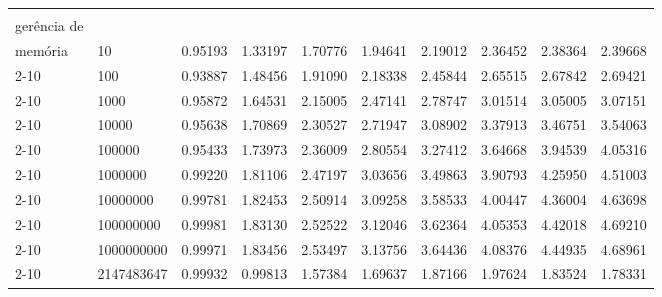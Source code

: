 \begin{flushleft}
{\begin{tabular}{|p{1.5cm}|p{1.2cm}|p{1.3cm}|p{1.3cm}|p{1.3cm}|p{1.3cm}|p{1.3cm}|p{1.3cm}|p{1.3cm}|p{1.3cm}|}
\rule{0pt}{4ex}\multirow{9}{*}{\shortstack[l]{\textit{Speedup} com\\gerência de \\memória}} 
& 10 						& 0.95193 			& 1.33197 				& 1.70776 			& 1.94641 			& 2.19012	 			& 	2.36452				& 2.38364 			& 2.39668\\\cline{2-10}
&100 						& 0.93887 			& 1.48456 			& 1.91090 			&  2.18338			& 2.45844 			&  2.65515				& 2.67842				& 2.69421\\\cline{2-10}
&1000 					& 0.95872 			& 1.64531 				& 2.15005 			&  2.47141				&  2.78747			&  3.01514			&  3.05005			& 3.07151\\\cline{2-10}
&10000 				& 0.95638 			& 1.70869 			& 2.30527 			& 2.71947	 			&  3.08902			&  3.37913			&  3.46751			& 3.54063\\\cline{2-10}
&100000 				& 0.95433 			& 1.73973 				&  2.36009			&  2.80554			&  3.27412				&  3.64668			&  3.94539			& 4.05316\\\cline{2-10}
&1000000			& 0.99220 			& 1.81106 				& 2.47197	 			&  3.03656			&  3.49863			&  3.90793			&  4.25950			& 4.51003\\\cline{2-10}
&10000000 		& 0.99781 			& 1.82453 			&  2.50914			&  3.09258			&  3.58533			&  4.00447			&  4.36004			& 4.63698\\\cline{2-10}
&100000000 		& 0.99981 			& 1.83130 				& 2.52522 			& 3.12046 			&  3.62364			&  4.05353			&  4.42018			& 4.69210\\\cline{2-10}
&1000000000	& 0.99971 			& 1.83456 			&  2.53497			&  3.13756			&  3.64436			&  4.08376			&  4.44935			& 4.68961\\\cline{2-10}
&2147483647		& 0.99932 			& 0.99813 			&  1.57384			&  1.69637			&  1.87166				&  1.97624			&  1.83524			& 1.78331\\\hline



\end{tabular}}
\end{flushleft}
